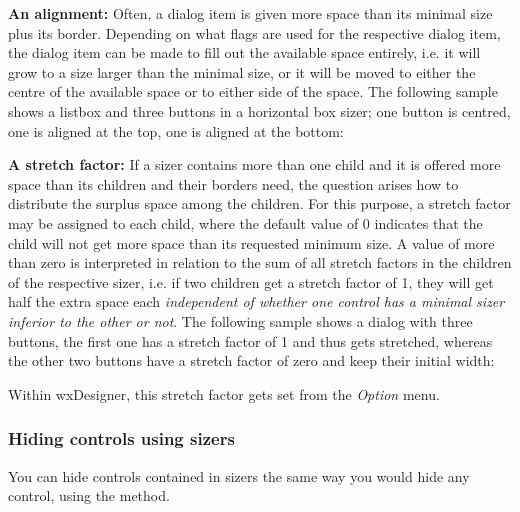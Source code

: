 \begin{center}
\gifsep
{}\gifsep
{}
\end{center}

{\bf An alignment:} Often, a dialog item is given more space than its minimal size
plus its border. Depending on what flags are used for the respective dialog
item, the dialog item can be made to fill out the available space entirely, i.e.
it will grow to a size larger than the minimal size, or it will be moved to either
the centre of the available space or to either side of the space. The following
sample shows a listbox and three buttons in a horizontal box sizer; one button
is centred, one is aligned at the top, one is aligned at the bottom:

\begin{center}
\end{center}

{\bf A stretch factor:} If a sizer contains more than one child and it is offered
more space than its children and their borders need, the question arises how to
distribute the surplus space among the children. For this purpose, a stretch
factor may be assigned to each child, where the default value of 0 indicates that the child
will not get more space than its requested minimum size. A value of more than zero
is interpreted in relation to the sum of all stretch factors in the children
of the respective sizer, i.e. if two children get a stretch factor of 1, they will
get half the extra space each {\it independent of whether one control has a minimal
sizer inferior to the other or not}. The following sample shows a dialog with
three buttons, the first one has a stretch factor of 1 and thus gets stretched,
whereas the other two buttons have a stretch factor of zero and keep their
initial width:

\begin{center}
\end{center}

Within wxDesigner, this stretch factor gets set from the {\it Option} menu.

\subsubsection{Hiding controls using sizers}\label{sizershiding}

You can hide controls contained in sizers the same way you would hide any control,
using the  method.


